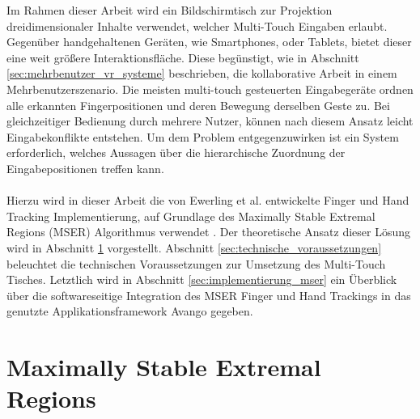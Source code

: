 Im Rahmen dieser Arbeit wird ein Bildschirmtisch zur Projektion dreidimensionaler Inhalte verwendet, welcher Multi-Touch Eingaben erlaubt. Gegenüber handgehaltenen Geräten, wie Smartphones, oder Tablets, bietet dieser eine weit größere Interaktionsfläche. Diese begünstigt, wie in Abschnitt \ref{sec:mehrbenutzer_vr_systeme} beschrieben, die kollaborative Arbeit in einem Mehrbenutzerszenario. Die meisten multi-touch gesteuerten Eingabegeräte ordnen alle erkannten Fingerpositionen und deren Bewegung derselben Geste zu. Bei gleichzeitiger Bedienung durch mehrere Nutzer, können nach diesem Ansatz leicht Eingabekonflikte entstehen. Um dem Problem entgegenzuwirken ist ein System erforderlich, welches Aussagen über die hierarchische Zuordnung der Eingabepositionen treffen kann.
\\\\
Hierzu wird in dieser Arbeit die von Ewerling et al. entwickelte Finger und Hand Tracking Implementierung, auf Grundlage des Maximally Stable Extremal Regions (MSER) Algorithmus verwendet \cite{matas:2004, ewerling:2012}. Der theoretische Ansatz dieser Lösung wird in Abschnitt \ref{sec:maximally_stable_extremal_regions} vorgestellt. Abschnitt \ref{sec:technische_voraussetzungen} beleuchtet die technischen Voraussetzungen zur Umsetzung des Multi-Touch Tisches. Letztlich wird in Abschnitt \ref{sec:implementierung_mser} ein Überblick über die softwareseitige Integration des  MSER Finger und Hand Trackings in das genutzte Applikationsframework Avango gegeben.


\section{Maximally Stable Extremal Regions}
\label{sec:maximally_stable_extremal_regions}

